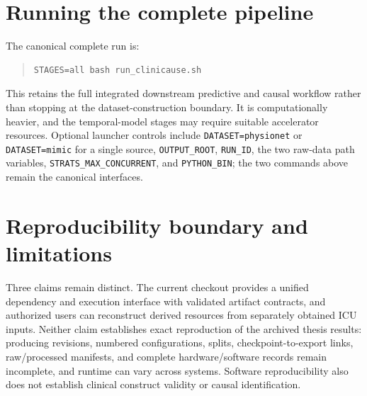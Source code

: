\section{Running the complete pipeline}

The canonical complete run is:

\begin{quote}\small
\begin{verbatim}
STAGES=all bash run_clinicause.sh
\end{verbatim}
\end{quote}

This retains the full integrated downstream predictive and causal workflow
rather than stopping at the dataset-construction boundary. It is
computationally heavier, and the temporal-model stages may require suitable
accelerator resources. Optional launcher controls include
\texttt{DATASET=physionet} or \texttt{DATASET=mimic} for a single source,
\texttt{OUTPUT\_ROOT}, \texttt{RUN\_ID}, the two raw-data path variables,
\texttt{STRATS\_MAX\_CONCURRENT}, and \texttt{PYTHON\_BIN}; the two commands
above remain the canonical interfaces.

\section{Reproducibility boundary and limitations}

Three claims remain distinct. The current checkout provides a unified dependency
and execution interface with validated artifact contracts, and authorized users
can reconstruct derived resources from separately obtained ICU inputs. Neither
claim establishes exact reproduction of the archived thesis results: producing
revisions, numbered configurations, splits, checkpoint-to-export links,
raw/processed manifests, and complete hardware/software records remain
incomplete, and runtime can vary across systems. Software reproducibility also
does not establish clinical construct validity or causal identification.
